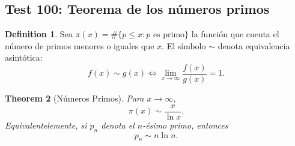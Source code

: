 \documentclass[11pt,a4paper]{article}
\theoremstyle{plain}
\newtheorem{theorem}{Theorem}[section]
\theoremstyle{definition}
\newtheorem{definition}[theorem]{Definition}
\begin{document}
\subsection*{Test 100: Teorema de los números primos}

\begin{definition}
Sea $\pi(x)=\#\{p\le x:p\text{ es primo}\}$ la función que cuenta el número de primos menores o iguales que $x$. El símbolo $\sim$ denota equivalencia asintótica:
\[
f(x)\sim g(x)\iff\lim_{x\to\infty}\frac{f(x)}{g(x)}=1.
\]
\end{definition}

\begin{theorem}[Números Primos]
Para $x\to\infty$,
\[
\pi(x)\sim\frac{x}{\ln x}.
\]
Equivalentelemente, si $p_{n}$ denota el $n$-ésimo primo, entonces
\[
p_{n}\sim n\ln n.
\]
\end{theorem}
\end{document}

